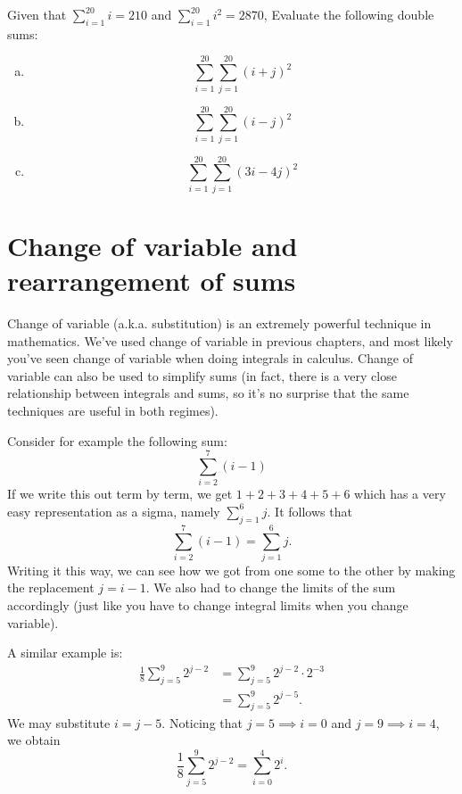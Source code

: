 \begin{exercise}{}
Given that $\sum_{i=1}^{20} i = 210$ and $\sum_{i=1}^{20} i^2 = 2870$, Evaluate the following double sums:
\begin{enumerate}[(a)]
\item
\[ \sum_{i=1}^{20} \sum_{j=1}^{20} (i+j)^2 \] 
\item
\[ \sum_{i=1}^{20} \sum_{j=1}^{20} (i-j)^2 \] 
\item
\[ \sum_{i=1}^{20} \sum_{j=1}^{20} (3i-4j)^2 \] 
\end{enumerate}
\end{exercise}


\section{Change of variable and  rearrangement of sums\quad
{}} \label{sec:sigmaNested}

Change of variable (a.k.a. substitution) is an extremely powerful technique in mathematics. We've used change of variable in previous chapters, and most likely you've seen change of variable when doing integrals in calculus.  Change of variable can also be used to simplify sums (in fact, there is a very close relationship between integrals and sums, so it's no surprise that the same techniques are useful in both regimes).

Consider for example the following sum:
\[\sum_{i=2}^{7}(i-1)\] 
If we write this out term by term, we get
$1+2+3+4+5+6$ which has a very easy representation as a sigma, namely 
$\sum_{j=1}^{6}j$. It follows that
\[\sum_{i=2}^{7}(i-1) = \sum_{j=1}^{6}j. \] 
Writing it this way, we can see how we got from one some to the other by making the replacement $j = i-1$. We also had to change the limits of the sum accordingly (just like you have to change integral limits when you change variable).

A similar example is:
\begin{align*}
\frac{1}{8}\sum_{j=5}^{9} 2^{j-2} &= \sum_{j=5}^{9} 2^{j-2} \cdot 2^{-3}\\
 &=\sum_{j=5}^{9} 2^{j-5}.
\end{align*}
We may substitute $i = j-5$.  Noticing that $j=5 \implies i=0$ and $j=9 \implies i=4$, we obtain
\[
\frac{1}{8}\sum_{j=5}^{9} 2^{j-2}
=\sum_{i=0}^4 2^i.
\]

